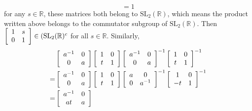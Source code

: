 \documentclass{article}
\begin{document}
\begin{Answer}
\begin{enumerate}[(a)]
{$$       = 1
       $$
       for any $s \in \mathbb{R}$,
       these matrices both belong to $\mathrm{SL}_2(\mathbb{R})$,
       which means the product written above belongs to the commutator subgroup of 
       $\mathrm{SL}_2(\mathbb{R})$. Then 
       $
       \left[\begin{array}{c c}
         1 & s \\ 0 & 1
       \end{array}\right] \in (\mathrm{SL}_2(\mathbb{R})^c
       $ for all $s \in \mathbb{R}$. Similarly,
       \begin{align*}
         &\left[\begin{array}{c c}
            a^{-1} & 0 \\ 0 & a
          \end{array}\right]
          \left[\begin{array}{c c}
            1 & 0 \\ t & 1
          \end{array}\right]
          \left[\begin{array}{c c}
            a^{-1} & 0 \\ 0 & a
          \end{array}\right]^{-1}
          \left[\begin{array}{c c}
            1 & 0 \\ t & 1
          \end{array}\right]^{-1} \\
        =&\left[\begin{array}{c c}
            a^{-1} & 0 \\ 0 & a
          \end{array}\right]
          \left[\begin{array}{c c}
            1 & 0 \\ t & 1
          \end{array}\right]
          \left[\begin{array}{c c}
            a & 0 \\ 0 & a^{-1}
          \end{array}\right]^{-1}
          \left[\begin{array}{c c}
            1 & 0 \\ -t & 1
          \end{array}\right]^{-1} \\
        =&\left[\begin{array}{c c}
            a^{-1} & 0 \\ at & a
          \end{array}\right]

\end{align*}}
\end{enumerate}
\end{Answer}
\end{document}
